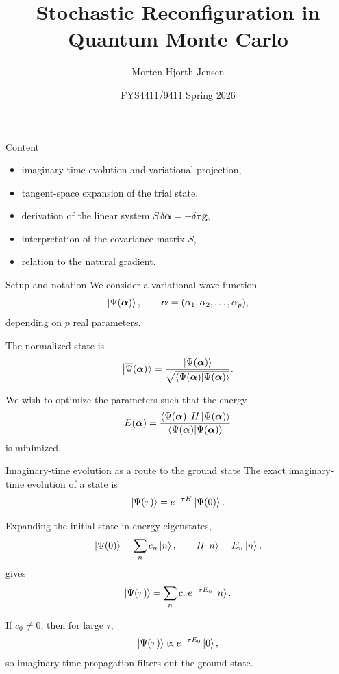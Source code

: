 \documentclass[aspectratio=169]{beamer}
\title{Stochastic Reconfiguration in Quantum Monte Carlo}
\author{Morten Hjorth-Jensen}
\date{FYS4411/9411 Spring 2026}
\begin{document}
\frame{\titlepage}

\begin{frame}{Content}
\begin{itemize}
\item imaginary-time evolution and variational projection,
\item tangent-space expansion of the trial state,
\item derivation of the linear system \(S \, \delta \bm{\alpha} = -\delta\tau \, \bm{g}\),
\item interpretation of the covariance matrix \(S\),
\item relation to the natural gradient.
\end{itemize}
\end{frame}

\begin{frame}{Setup and notation}
We consider a variational wave function
\[
\ket{\Psi(\bm{\alpha})},
\qquad
\bm{\alpha}=(\alpha_1,\alpha_2,\dots,\alpha_p),
\]
depending on \(p\) real parameters.

\medskip

The normalized state is
\[
\ket{\overline{\Psi}(\bm{\alpha})}
=
\frac{\ket{\Psi(\bm{\alpha})}}
{\sqrt{\braket{\Psi(\bm{\alpha})}{\Psi(\bm{\alpha})}}}.
\]

We wish to optimize the parameters such that the energy
\[
E(\bm{\alpha})
=
\frac{\bra{\Psi(\bm{\alpha})}H\ket{\Psi(\bm{\alpha})}}
{\braket{\Psi(\bm{\alpha})}{\Psi(\bm{\alpha})}}
\]
is minimized.
\end{frame}

\begin{frame}{Imaginary-time evolution as a route to the ground state}
The exact imaginary-time evolution of a state is
\[
\ket{\Psi(\tau)}
=
e^{-\tau H}\ket{\Psi(0)}.
\]

Expanding the initial state in energy eigenstates,
\[
\ket{\Psi(0)}=\sum_n c_n \ket{n},
\qquad
H\ket{n}=E_n\ket{n},
\]
gives
\[
\ket{\Psi(\tau)}
=
\sum_n c_n e^{-\tau E_n}\ket{n}.
\]

If \(c_0\neq 0\), then for large \(\tau\),
\[
\ket{\Psi(\tau)} \propto e^{-\tau E_0}\ket{0},
\]
so imaginary-time propagation filters out the ground state.
\end{frame}
\end{document}
